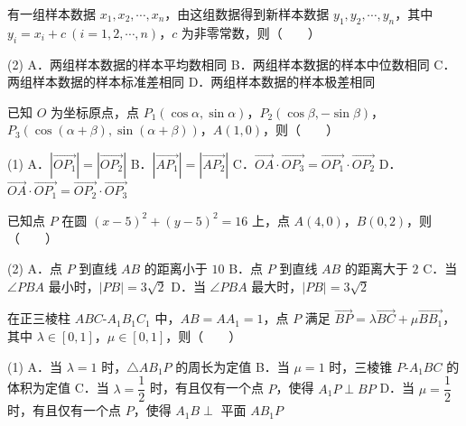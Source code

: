 \begin{question}
有一组样本数据 $x_1,x_2,\cdots,x_n$，由这组数据得到新样本数据 $y_1,y_2,\cdots,y_n$，其中 $y_i=x_i+c\ (i=1,2,\cdots,n)$，$c$ 为非零常数，则\mbox{（　　）}

\begin{gkopts}(2)
\task A．两组样本数据的样本平均数相同
\task B．两组样本数据的样本中位数相同
\task C．两组样本数据的样本标准差相同
\task D．两组样本数据的样本极差相同
\end{gkopts}

\end{question}
\begin{question}
已知 $O$ 为坐标原点，点 $P_1(\cos\alpha,\sin\alpha)$，$P_2(\cos\beta,-\sin\beta)$，$P_3(\cos(\alpha+\beta),\sin(\alpha+\beta))$，$A(1,0)$，则\mbox{（　　）}

\begin{gkopts}(1)
\task A．$\left|\overrightarrow{OP_1}\right|=\left|\overrightarrow{OP_2}\right|$
\task B．$\left|\overrightarrow{AP_1}\right|=\left|\overrightarrow{AP_2}\right|$
\task C．$\overrightarrow{OA}\cdot\overrightarrow{OP_3}=\overrightarrow{OP_1}\cdot\overrightarrow{OP_2}$
\task D．$\overrightarrow{OA}\cdot\overrightarrow{OP_1}=\overrightarrow{OP_2}\cdot\overrightarrow{OP_3}$
\end{gkopts}

\end{question}
\begin{question}
已知点 $P$ 在圆 $(x-5)^{2}+(y-5)^{2}=16$ 上，点 $A(4,0)$，$B(0,2)$，则\mbox{（　　）}

\begin{gkopts}(2)
\task A．点 $P$ 到直线 $AB$ 的距离小于 $10$
\task B．点 $P$ 到直线 $AB$ 的距离大于 $2$
\task C．当 $\angle PBA$ 最小时，$|PB|=3\sqrt2$
\task D．当 $\angle PBA$ 最大时，$|PB|=3\sqrt2$
\end{gkopts}

\end{question}
\begin{question}
在正三棱柱 $ABC\text{-}A_1B_1C_1$ 中，$AB=AA_1=1$，点 $P$ 满足 $\overrightarrow{BP}=\lambda\overrightarrow{BC}+\mu\overrightarrow{BB_1}$，其中 $\lambda\in[0,1]$，$\mu\in[0,1]$，则\mbox{（　　）}

\begin{gkopts}(1)
\task A．当 $\lambda=1$ 时，$\triangle AB_1P$ 的周长为定值
\task B．当 $\mu=1$ 时，三棱锥 $P\text{-}A_1BC$ 的体积为定值
\task C．当 $\lambda=\dfrac12$ 时，有且仅有一个点 $P$，使得 $A_1P\perp BP$
\task D．当 $\mu=\dfrac12$ 时，有且仅有一个点 $P$，使得 $A_1B\perp$ 平面 $AB_1P$
\end{gkopts}

\par\medskip

\end{question}

